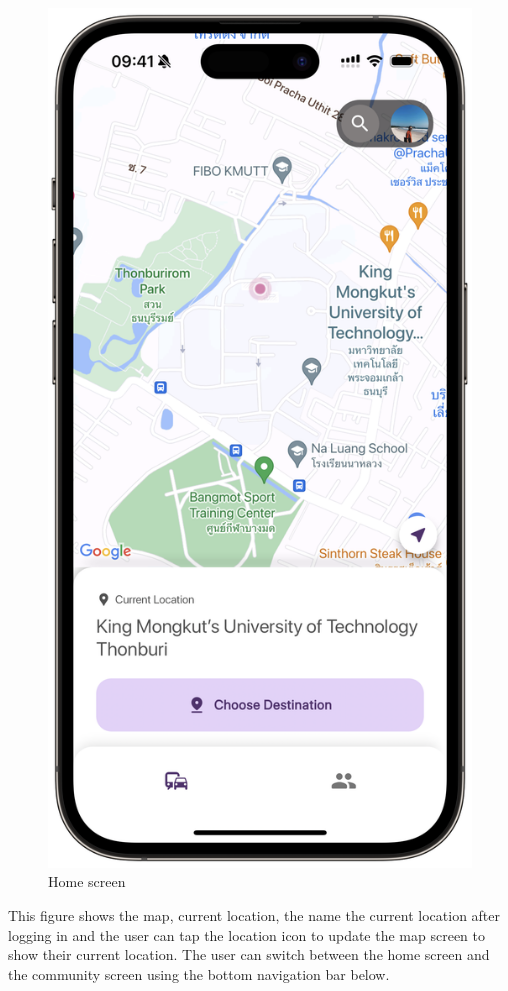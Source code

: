 \newpage
\begin{figure}[!h]
	\centering
	\includegraphics[width=0.5\linewidth]{chapter4/home_screen.png}
	\caption{Home screen}
	\label{fig:Home screen}
\end{figure}
This figure shows the map, current location, the name the current location after logging in and the user can tap the location icon to update the map screen to show their current location. The user can switch between the home screen and the community screen using the bottom navigation bar below.

